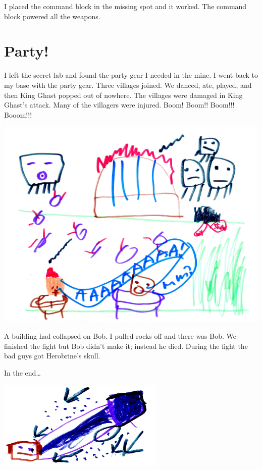 \documentclass[12pt,oneside]{krantz}
\begin{document}
I placed the command block in the missing spot and it worked. The
command block powered all the weapons.

\hypertarget{party}{%
\chapter{Party!}\label{party}}

I left the secret lab and found the party gear I needed in the mine. I
went back to my base with the party gear. Three villages joined. We
danced, ate, played, and then King Ghast popped out of nowhere. The
villages were damaged in King Ghast's attack. Many of the villagers were
injured. Boom! Boom!! Boom!!! Booom!!!

\includegraphics[width=5.20833in,height=\textheight]{img/king-ghast/04-everyone.jpg}

A building had collapsed on Bob. I pulled rocks off and there was Bob.
We finished the fight but Bob didn't make it; instead he died. During
the fight the bad guys got Herobrine's skull.

In the end\ldots{}

\includegraphics[width=3.125in,height=\textheight]{img/king-ghast/04-jar.jpg}
\end{document}
